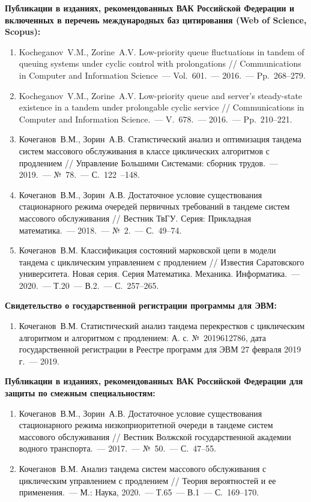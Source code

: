 \textbf{Публикации в изданиях, рекомендованных ВАК Российской Федерации и включенных в перечень международных баз цитирования (Web of Science, Scopus):}
\begin{enumerate}
\item Kocheganov~V.M., Zorine~A.V. Low-priority queue fluctuations in tandem of queuing systems under cyclic control with prolongations // Communications in Computer and Information Science~--- Vol.~601.~--- 2016.~--- Pp.~268--279.
\item Kocheganov~V.M., Zorine~A.V. Low-priority queue and server's steady-state existence in a tandem under prolongable cyclic service // Communications in Computer and Information Science.~--- V.~678.~--- 2016.~--- Pp.~210--221.
\item  Кочеганов~В.М., Зорин~А.В. Статистический анализ и оптимизация тандема систем массового обслуживания в классе циклических алгоритмов с продлением // Управление Большими Системами: сборник трудов.~--- 2019.~--- №~78.~--- С.~122~--148.
\item Кочеганов~В.М., Зорин~А.В. Достаточное условие существования стационарного режима очередей первичных требований в тандеме систем массового обслуживания // Вестник ТвГУ. Серия: Прикладная математика.~--- 2018.~--- №~2.~--- С.~49--74.
\item
 Кочеганов~В.М. Классификация состояний марковской цепи в модели тандема с циклическим управлением с продлением // Известия Саратовского университета. Новая серия. Серия Математика. Механика. Информатика.~--- 2020.~--- Т.20~--- В.2.~--- С.~257--265.
\end{enumerate}	

\textbf{Свидетельство о государственной регистрации программы для ЭВМ:}
\begin{enumerate}[resume]
	\item Кочеганов~В.М. Статистический анализ тандема перекрестков с циклическим алгоритмом и алгоритмом с продлением: А. с. №~2019612786, дата государственной регистрации в Реестре программ для ЭВМ 27 февраля
2019 г.~--- 2019.
\end{enumerate}

\pagebreak
\textbf{Публикации в изданиях, рекомендованных ВАК Российской Федерации для защиты по смежным специальностям:}

\begin{enumerate} 	[resume]
\item Кочеганов~В.М., Зорин~А.В. Достаточное условие существования стационарного режима низкоприоритетной очереди в тандеме систем массового обслуживания // Вестник Волжской государственной академии водного транспорта.~--- 2017.~--- №~50.~--- С.~47--55.
\item Кочеганов~В.М. Анализ тандема систем
массового обслуживания с циклическим управлением с продлением // Теория вероятностей и ее применения.~--- М.: Наука, 2020.~--- Т.65~--- В.1~--- С.~169--170.
\end{enumerate}	

